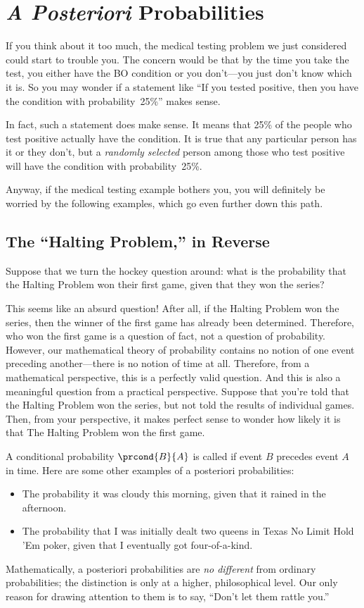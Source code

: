 \section{\emph{A Posteriori} Probabilities}\label{aposteriori_subsec}

If you think about it too much, the medical testing problem we just
considered could start to trouble you.  The concern would be that by
the time you take the test, you either have the BO condition or you
don't---you just don't know which it is.  So you may wonder if a
statement like ``If you tested positive, then you have the condition
with probability~25\%'' makes sense.

In fact, such a statement does make sense.  It means that 25\% of the
people who test positive actually have the condition.  It is true that
any particular person has it or they don't, but a \emph{randomly
  selected} person among those who test positive will have the
condition with probability~25\%.

Anyway, if the medical testing example bothers you, you will
definitely be worried by the following examples, which go even further
down this path.

\subsection{The ``Halting Problem,'' in Reverse}

Suppose that we turn the hockey question around: what is the
probability that the Halting Problem won their first game, given that
they won the series?

This seems like an absurd question!  After all, if the Halting Problem
won the series, then the winner of the first game has already been
determined.  Therefore, who won the first game is a question of fact,
not a question of probability.  However, our mathematical theory of
probability contains no notion of one event preceding another---there
is no notion of time at all.  Therefore, from a mathematical
perspective, this is a perfectly valid question.  And this is also a
meaningful question from a practical perspective.  Suppose that you're
told that the Halting Problem won the series, but not told the results
of individual games.  Then, from your perspective, it makes perfect
sense to wonder how likely it is that The Halting Problem won the
first game.

A conditional probability $\prcond{B}{A}$ is called   if event $B$ precedes event $A$ in time.  Here are some
other examples of a posteriori probabilities:
%
\begin{itemize}
\item The probability it was cloudy this morning, given that it rained
in the afternoon.
\item The probability that I was initially dealt two queens in Texas
No Limit Hold 'Em poker, given that I eventually got four-of-a-kind.
\end{itemize}
%
Mathematically, a posteriori probabilities are \emph{no different}
from ordinary probabilities; the distinction is only at a higher,
philosophical level.  Our only reason for drawing attention to them is
to say, ``Don't let them rattle you.''

